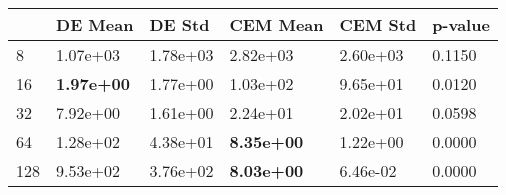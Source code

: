 \begin{tabular}{llllll}
\toprule
{} &            DE Mean &    DE Std &           CEM Mean &   CEM Std & p-value \\
\midrule
8   &           1.07e+03 &  1.78e+03 &           2.82e+03 &  2.60e+03 &  0.1150 \\
16  &  \textbf{1.97e+00} &  1.77e+00 &           1.03e+02 &  9.65e+01 &  0.0120 \\
32  &           7.92e+00 &  1.61e+00 &           2.24e+01 &  2.02e+01 &  0.0598 \\
64  &           1.28e+02 &  4.38e+01 &  \textbf{8.35e+00} &  1.22e+00 &  0.0000 \\
128 &           9.53e+02 &  3.76e+02 &  \textbf{8.03e+00} &  6.46e-02 &  0.0000 \\
\bottomrule
\end{tabular}
